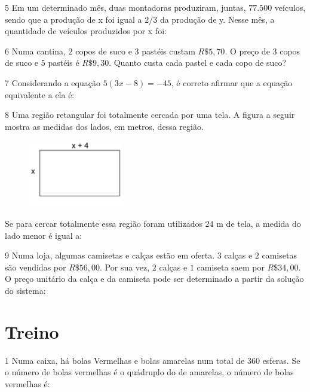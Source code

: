\num{5}  Em um determinado mês, duas montadoras produziram, juntas, $77.500$
veículos, sendo que a produção de x foi igual a $2/3$ da produção de y. Nesse mês, a quantidade de veículos produzidos por x foi:


\num{6}  Numa cantina, $2$ copos de suco e $3$ pastéis custam $R\$5,70$. O preço de
3 copos de suco e $5$ pastéis é $R\$9,30$. Quanto custa cada pastel e cada
copo de suco?


\num{7}  Considerando a equação $5(3x - 8) = -45$, é correto afirmar que a equação equivalente a ela é:


\num{8}  Uma região retangular foi totalmente cercada por uma tela. A figura a
seguir mostra as medidas dos lados, em metros, dessa região.

\begin{figure}
\centering\includegraphics[width=1.65625in,height=1.14583in]{./imgSAEB_6_MAT/media/image38.png}
\end{figure}

Se para cercar totalmente essa região foram utilizados $24$ m de tela, a
medida do lado menor é igual a:


\num{9} Numa loja, algumas camisetas e calças estão em oferta. $3$ calças e $2$
camisetas são vendidas por $R\$56,00$. Por sua vez, $2$ calças e $1$ camiseta
saem por $R\$34,00$. O preço unitário da calça e da camiseta pode ser
determinado a partir da solução do sistema:


\section{Treino}

\num{1}  Numa caixa, há bolas Vermelhas e bolas amarelas num total de $360$
esferas. Se o número de bolas vermelhas é o quádruplo do de amarelas, o
número de bolas vermelhas é:

